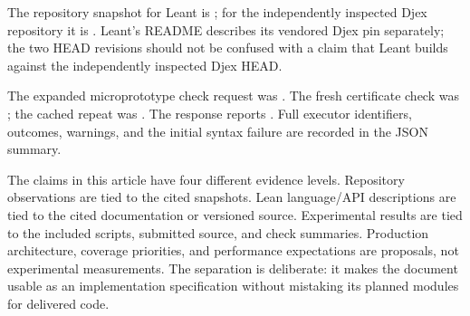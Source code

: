 The repository snapshot for Leant is
; for the independently inspected
Djex repository it is
. Leant's README describes its
vendored Djex pin separately; the two HEAD revisions should not be confused
with a claim that Leant builds against the independently inspected Djex HEAD.

The expanded microprototype check request was
. The fresh certificate check was
; the cached repeat was
. The response reports
. Full executor identifiers, outcomes, warnings, and the
initial syntax failure are recorded in the JSON summary.

The claims in this article have four different evidence levels. Repository
observations are tied to the cited snapshots. Lean language/API descriptions
are tied to the cited documentation or versioned source. Experimental results
are tied to the included scripts, submitted source, and check summaries.
Production architecture, coverage priorities, and performance expectations are
proposals, not experimental measurements. The separation is deliberate: it
makes the document usable as an implementation specification without mistaking
its planned modules for delivered code.
